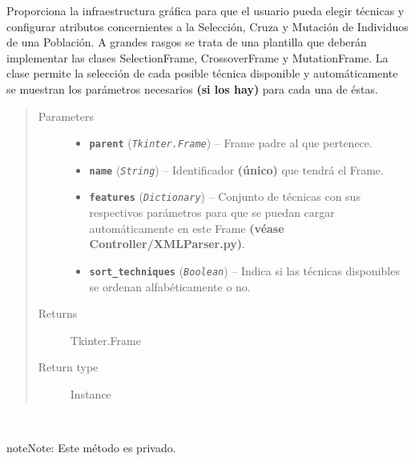 \documentclass[class=report, crop=false]{standalone}
\begin{document}
\begin{fulllineitems}

\begin{DUlineblock}{0em}
\item[] Proporciona la infraestructura gráfica para que el usuario 
pueda elegir técnicas y configurar atributos concernientes a la 
Selección, Cruza y Mutación de Individuos de una Población.\break
A grandes rasgos se trata de una plantilla que deberán implementar 
las clases SelectionFrame, CrossoverFrame y MutationFrame.\break
La clase permite la selección de cada posible técnica disponible 
y automáticamente se muestran los parámetros necesarios \textbf{(si los hay)} 
para cada una de éstas.
\end{DUlineblock}

\begin{quote}\begin{description}
\item[{Parameters}] \leavevmode\begin{itemize}
\item \textbf{\texttt{parent}} (\emph{\texttt{Tkinter.Frame}}) -- Frame padre al que pertenece.
\item \textbf{\texttt{name}} (\emph{\texttt{String}}) -- Identificador \textbf{(único)} que tendrá el Frame.
\item \textbf{\texttt{features}} (\emph{\texttt{Dictionary}}) -- Conjunto de técnicas con sus respectivos parámetros para que se puedan cargar automáticamente en este Frame \textbf{(véase Controller/XMLParser.py)}.
\item \textbf{\texttt{sort\_techniques}} (\emph{\texttt{Boolean}}) -- Indica si las técnicas disponibles se ordenan alfabéticamente
o no.
\end{itemize}

\item[{Returns}] \leavevmode
Tkinter.Frame
\item[{Return type}] \leavevmode
Instance
\end{description}\end{quote}


\begin{fulllineitems}

~

\begin{notice}{note}{Note:}
Este método es privado.
\end{notice}


\end{fulllineitems}
\end{fulllineitems}
\end{document}
